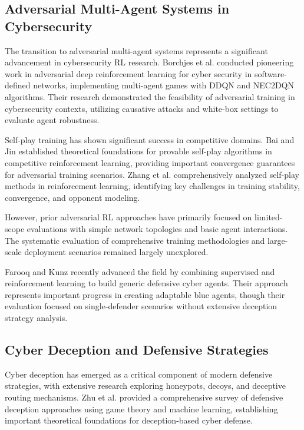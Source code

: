 \documentclass[12pt]{article}
\theoremstyle{definition}
\theoremstyle{plain}
\begin{document}
\subsection{Adversarial Multi-Agent Systems in Cybersecurity}

The transition to adversarial multi-agent systems represents a significant advancement in cybersecurity RL research. Borchjes et al. \cite{borchjes2023adversarial} conducted pioneering work in adversarial deep reinforcement learning for cyber security in software-defined networks, implementing multi-agent games with DDQN and NEC2DQN algorithms. Their research demonstrated the feasibility of adversarial training in cybersecurity contexts, utilizing causative attacks and white-box settings to evaluate agent robustness.

Self-play training has shown significant success in competitive domains. Bai and Jin \cite{bai2020provable} established theoretical foundations for provable self-play algorithms in competitive reinforcement learning, providing important convergence guarantees for adversarial training scenarios. Zhang et al. \cite{zhang2024survey} comprehensively analyzed self-play methods in reinforcement learning, identifying key challenges in training stability, convergence, and opponent modeling.

However, prior adversarial RL approaches have primarily focused on limited-scope evaluations with simple network topologies and basic agent interactions. The systematic evaluation of comprehensive training methodologies and large-scale deployment scenarios remained largely unexplored.

Farooq and Kunz \cite{farooq2025combining} recently advanced the field by combining supervised and reinforcement learning to build generic defensive cyber agents. Their approach represents important progress in creating adaptable blue agents, though their evaluation focused on single-defender scenarios without extensive deception strategy analysis.

\subsection{Cyber Deception and Defensive Strategies}

Cyber deception has emerged as a critical component of modern defensive strategies, with extensive research exploring honeypots, decoys, and deceptive routing mechanisms. Zhu et al. \cite{zhu2021survey} provided a comprehensive survey of defensive deception approaches using game theory and machine learning, establishing important theoretical foundations for deception-based cyber defense.
\end{document}
